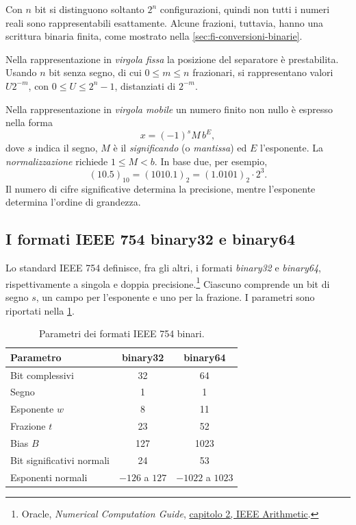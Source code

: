Con \(n\) bit si distinguono soltanto \(2^n\) configurazioni, quindi
non tutti i numeri reali sono rappresentabili esattamente. Alcune
frazioni, tuttavia, hanno una scrittura binaria finita, come mostrato
nella \cref{sec:fi-conversioni-binarie}.

Nella rappresentazione in \emph{virgola fissa} la posizione del
separatore è prestabilita. Usando \(n\) bit senza segno, di cui
\(0\le m\le n\) frazionari, si rappresentano valori \(U2^{-m}\), con
\(0\le U\le2^n-1\), distanziati di \(2^{-m}\).

Nella rappresentazione in \emph{virgola mobile} un numero finito non
nullo è espresso nella forma
\[
  x=(-1)^sM\,b^E,
\]
dove \(s\) indica il segno, \(M\) è il \emph{significando} (o
\emph{mantissa}) ed \(E\) l'esponente. La \emph{normalizzazione}
richiede \(1\le M<b\). In base due, per esempio,
\[
  (10.5)_{10}=(1010.1)_2=(1.0101)_2\cdot2^3.
\]
Il numero di cifre significative determina la precisione, mentre
l'esponente determina l'ordine di grandezza.

\subsection{I formati IEEE 754 binary32 e binary64}
\label{sec:fi-ieee754}

Lo standard IEEE 754 definisce, fra gli altri, i formati \emph{binary32}
e \emph{binary64}, rispettivamente a singola e doppia precisione.\footnote{
Oracle, \emph{Numerical Computation Guide},
\href{https://docs.oracle.com/cd/E19957-01/806-3568/ncg_math.html}{capitolo 2, IEEE Arithmetic}.}
Ciascuno comprende un bit di segno \(s\), un campo per l'esponente e
uno per la frazione. I parametri sono riportati nella
\cref{tab:fi-formati-ieee}.

\begin{table}[htbp]
  \centering
  \begin{tabular}{lcc}
    \toprule
    Parametro & binary32 & binary64 \\
    \midrule
    Bit complessivi & 32 & 64 \\
    Segno & 1 & 1 \\
    Esponente \(w\) & 8 & 11 \\
    Frazione \(t\) & 23 & 52 \\
    Bias \(B\) & 127 & 1023 \\
    Bit significativi normali & 24 & 53 \\
    Esponenti normali & \(-126\) a \(127\) & \(-1022\) a \(1023\) \\
    \bottomrule
  \end{tabular}
  \caption{Parametri dei formati IEEE 754 binari.}
  \label{tab:fi-formati-ieee}
\end{table}

